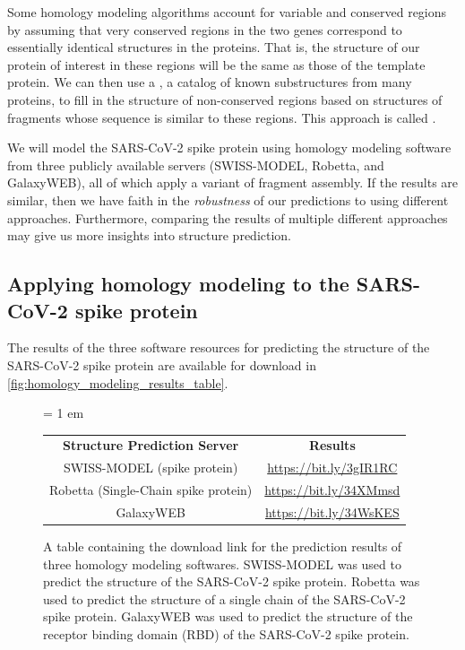 Some homology modeling algorithms account for variable and conserved regions by assuming that very conserved regions in the two genes correspond to essentially identical structures in the proteins. That is, the structure of our protein of interest in these regions will be the same as those of the template protein. We can then use a , a catalog of known substructures from many proteins, to fill in the structure of non-conserved regions based on structures of fragments whose sequence is similar to these regions. This approach is called .

We will model the SARS-CoV-2 spike protein using homology modeling software from three publicly available servers (SWISS-MODEL, Robetta, and GalaxyWEB), all of which apply a variant of fragment assembly. If the results are similar, then we have faith in the \textit{robustness} of our predictions to using different approaches. Furthermore, comparing the results of multiple different approaches may give us more insights into structure prediction. 

\FloatBarrier
{}
\subsection{Applying homology modeling to the SARS-CoV-2 spike protein}

The results of the three software resources for predicting the structure of the SARS-CoV-2 spike protein are available for download in \autoref{fig:homology_modeling_results_table}.\\

\begin{figure}[h]
	\centering
	\tabcolsep = 1 em
	\mySfFamily
	\begin{tabular}{c c}
		\textbf{Structure Prediction Server} & \textbf{Results} \\
		SWISS-MODEL (spike protein) & \url{https://bit.ly/3gIR1RC} \\
		Robetta (Single-Chain spike protein) & \url{https://bit.ly/34XMmsd} \\
		GalaxyWEB & \url{https://bit.ly/34WsKES} \\
	\end{tabular}
	\caption{A table containing the download link for the prediction results of three homology modeling softwares. SWISS-MODEL was used to predict the structure of the SARS-CoV-2 spike protein. Robetta was used to predict the structure of a single chain of the SARS-CoV-2 spike protein. GalaxyWEB was used to predict the structure of the receptor binding domain (RBD) of the SARS-CoV-2 spike protein.}
	\label{fig:homology_modeling_results_table}
\end{figure}

